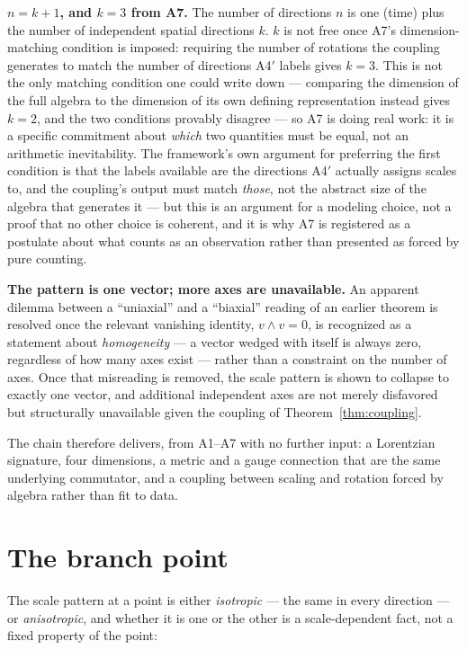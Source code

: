 \documentclass[aps,prd,twocolumn,superscriptaddress,nofootinbib]{revtex4-2}
\begin{document}
\textbf{$n=k+1$, and $k=3$ from A7.} The number of directions $n$ is one
(time) plus the number of independent spatial directions $k$. $k$ is not
free once A7's dimension-matching condition is imposed: requiring the
number of rotations the coupling generates to match the number of
directions A4$'$ labels gives $k=3$. This is not the only matching
condition one could write down — comparing the dimension of the full
algebra to the dimension of its own defining representation instead
gives $k=2$, and the two conditions provably disagree — so A7 is doing
real work: it is a specific commitment about \emph{which} two quantities
must be equal, not an arithmetic inevitability. The framework's own
argument for preferring the first condition is that the labels available
are the directions A4$'$ actually assigns scales to, and the coupling's
output must match \emph{those}, not the abstract size of the algebra
that generates it — but this is an argument for a modeling choice, not a
proof that no other choice is coherent, and it is why A7 is registered
as a postulate about what counts as an observation rather than presented
as forced by pure counting.

\textbf{The pattern is one vector; more axes are unavailable.} An
apparent dilemma between a ``uniaxial'' and a ``biaxial'' reading of an
earlier theorem is resolved once the relevant vanishing identity,
$v \wedge v = 0$, is recognized as a statement about \emph{homogeneity} —
a vector wedged with itself is always zero, regardless of how many axes
exist — rather than a constraint on the number of axes. Once that
misreading is removed, the scale pattern is shown to collapse to exactly
one vector, and additional independent axes are not merely disfavored
but structurally unavailable given the coupling of Theorem~\ref{thm:coupling}.

The chain therefore delivers, from A1–A7 with no further input: a
Lorentzian signature, four dimensions, a metric and a gauge connection
that are the same underlying commutator, and a coupling between scaling
and rotation forced by algebra rather than fit to data.

\section{The branch point}\label{sec:branch}

The scale pattern at a point is either \emph{isotropic} — the same in
every direction — or \emph{anisotropic}, and whether it is one or the
other is a scale-dependent fact, not a fixed property of the point:
\end{document}
